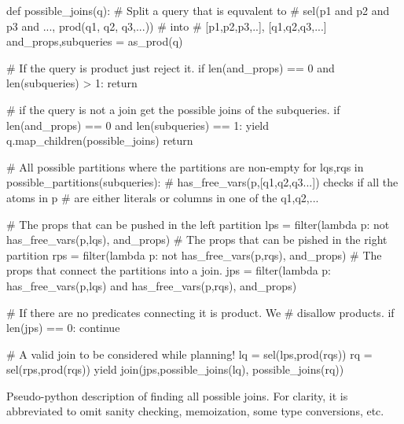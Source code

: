 \begin{code}
  \begin{pycode}
    def possible_joins(q):
        # Split a query that is equvalent to
        # sel(p1 and p2 and p3 and ..., prod(q1, q2, q3,...))
        # into
        # [p1,p2,p3,..], [q1,q2,q3,...]
        and_props,subqueries =  as_prod(q)

        # If the query is product just reject it.
        if len(and_props) == 0 and len(subqueries) > 1:
            return

        # if the query is not a join get the possible joins of the subqueries.
        if len(and_props) == 0 and len(subqueries) == 1:
            yield q.map_children(possible_joins)
            return

        # All possible partitions where the partitions are non-empty
        for lqs,rqs in possible_partitions(subqueries):
            # has_free_vars(p,[q1,q2,q3...]) checks if all the atoms in p
            # are either literals or columns in one of the q1,q2,...

            # The props that can be pushed in the left partition
            lps = filter(lambda p: not has_free_vars(p,lqs), and_props)
            # The props that can be pished in the right partition
            rps = filter(lambda p: not has_free_vars(p,rqs), and_props)
            # The props that connect the partitions into a join.
            jps = filter(lambda p: has_free_vars(p,lqs)
                         and has_free_vars(p,rqs),
                         and_props)

            # If there are no predicates connecting it is product. We
            # disallow products.
            if len(jps) == 0: continue

            # A valid join to be considered while planning!
            lq = sel(lps,prod(rqs))
            rq = sel(rps,prod(rqs))
            yield join(jps,possible_joins(lq), possible_joins(rq))
  \end{pycode}
  \caption{\label{lst:possible_joins} Pseudo-python description of
    finding all possible joins. For clarity, it is abbreviated to omit sanity
    checking, memoization, some type conversions, etc.}
\end{code}

